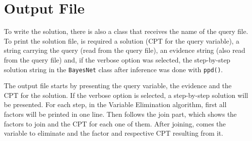 \documentclass[11pt,a4paper]{article}
\begin{document}
\section{Output File}
To write the solution, there is also a class that receives the name of the query file. To print the solution file, is required a solution (CPT for the query variable), a string carrying the query (read from the query file),  an evidence string (also read from the query file) and, if the verbose option was selected, the step-by-step solution string in the \texttt{BayesNet} class after inference was done with \texttt{ppd()}.

The output file starts by presenting the query variable, the evidence and the CPT for the solution.
If the verbose option is selected, a step-by-step solution will be presented. For each step, in the Variable Elimination algorithm, first all factors will be printed in one line. Then follows the join part, which shows the factors to join and the CPT for each one of them. After joining, comes the variable to eliminate and the factor and respective CPT resulting from it. 


\nocite{*}


\end{document}
